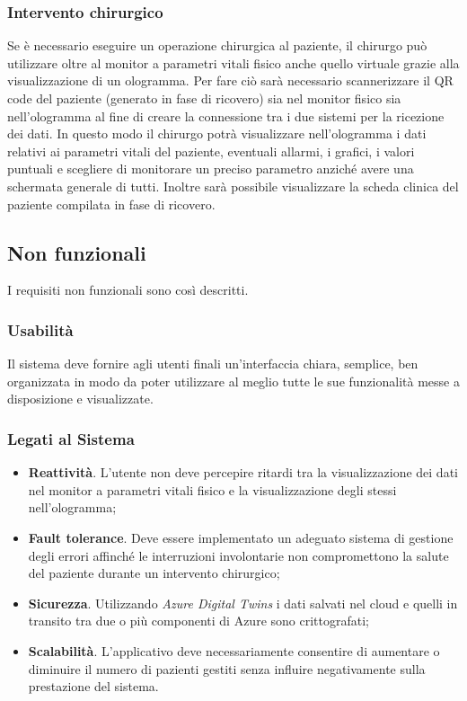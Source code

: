 \subsubsection{Intervento chirurgico}
Se è necessario eseguire un operazione chirurgica al paziente, il chirurgo può utilizzare oltre al monitor a parametri vitali fisico anche quello virtuale grazie alla visualizzazione di un ologramma. Per fare ciò sarà necessario scannerizzare il QR code del paziente (generato in fase di ricovero) sia nel monitor fisico sia nell'ologramma al fine di creare la connessione tra i due sistemi per la ricezione dei dati. In questo modo il chirurgo potrà visualizzare nell'ologramma i dati relativi ai parametri vitali del paziente, eventuali allarmi, i grafici, i valori puntuali e scegliere di monitorare un preciso parametro anziché avere una schermata generale di tutti. Inoltre sarà possibile visualizzare la scheda clinica del paziente compilata in fase di ricovero.

\subsection{Non funzionali}
I requisiti non funzionali sono così descritti.

\subsubsection{Usabilità}
Il sistema deve fornire agli utenti finali un’interfaccia chiara, semplice, ben organizzata in modo da poter utilizzare al meglio tutte le sue funzionalità messe a disposizione e visualizzate.

\subsubsection{Legati al Sistema}
\begin{itemize}
    \item \textbf{Reattività}. L'utente non deve percepire ritardi tra la visualizzazione dei dati nel monitor a parametri vitali fisico e la visualizzazione degli stessi nell'ologramma;
    
    \item \textbf{Fault tolerance}. Deve essere implementato un adeguato sistema di gestione degli errori affinché le interruzioni involontarie non compromettono la salute del paziente durante un intervento chirurgico;
    
    \item \textbf{Sicurezza}. Utilizzando \textit{Azure Digital Twins} i dati salvati nel cloud e quelli in transito tra due o più componenti di Azure sono crittografati;
    
    \item \textbf{Scalabilità}. L’applicativo deve necessariamente consentire di aumentare o diminuire il numero di pazienti gestiti senza influire negativamente sulla prestazione del sistema. 
\end{itemize}

